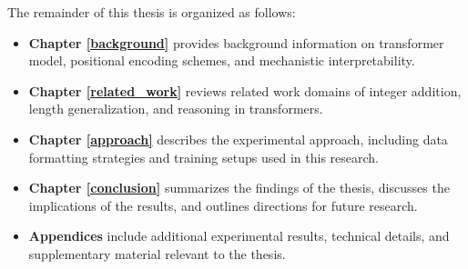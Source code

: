 The remainder of this thesis is organized as follows:

\begin{itemize}
    \item \textbf{Chapter \ref{background}} provides background information on transformer model, positional encoding schemes, and mechanistic interpretability.
    \item \textbf{Chapter \ref{related_work}} reviews related work domains of integer addition, length generalization, and reasoning in transformers.
    \item \textbf{Chapter \ref{approach}} describes the experimental approach, including data formatting strategies and training setups used in this research.
    \item \textbf{Chapter \ref{conclusion}} summarizes the findings of the thesis, discusses the implications of the results, and outlines directions for future research.
    \item \textbf{Appendices} include additional experimental results, technical details, and supplementary material relevant to the thesis.
\end{itemize}
